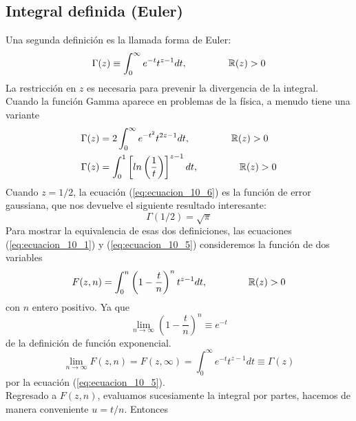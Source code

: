 \subsection{Integral definida (Euler)}
Una segunda definición es la llamada forma de Euler:
\begin{equation}
\Gamma (z) \equiv \int_{0}^{\infty} e^{-t} t^{z-1} dt, \hspace{1.5cm} \mathbb{R}(z) > 0
\label{eq:ecuacion_10_5}
\end{equation}
La restricción en $z$ es necesaria para prevenir la divergencia de la integral. Cuando la función Gamma aparece en problemas de la física, a menudo tiene una variante
\begin{eqnarray}
\Gamma (z) &= 2 \int_{0}^{\infty} e^{-t^{2}} t^{2z-1} dt, \hspace{1.5cm} \mathbb{R}(z) > 0  \label{eq:ecuacion_10_6} \\
\Gamma (z) &=  \int_{0}^{1} \left[ ln\left(\dfrac{1}{t} \right) \right]^{z-1} dt, \hspace{1.5cm} \mathbb{R}(z) > 0 \label{eq:ecuacion_10_7}
\end{eqnarray}
Cuando $z=1/2$, la ecuación (\ref{eq:ecuacion_10_6}) es la función de error gaussiana, que nos devuelve el siguiente resultado interesante:
\begin{equation}
\Gamma (1/2) = \sqrt{\pi}
\label{eq:ecuacion_10_8}
\end{equation}
Para mostrar la equivalencia de esas dos definiciones, las ecuaciones (\ref{eq:ecuacion_10_1}) y (\ref{eq:ecuacion_10_5}) consideremos la función de dos variables
\begin{equation}
F(z,n) = \int_{0}^{n} \left( 1 - \dfrac{t}{n} \right)^{n} t^{z-1} dt, \hspace{1.5cm} \mathbb{R}(z) > 0
\label{eq:ecuacion_10_9}
\end{equation}
con $n$ entero positivo. Ya que
\begin{equation}
\lim_{n \to \infty} \left( 1 - \dfrac{t}{n} \right)^{n} \equiv e^{-t}
\label{eq:ecuacion_10_10}
\end{equation}
de la definición de función exponencial.
\begin{equation}
\lim_{n \to \infty} F(z,n) = F(z,\infty) = \int_{0}^{\infty} e^{-t} t^{z-1} dt \equiv \Gamma (z)
\label{eq:ecuacione_10_11}
\end{equation}
por la ecuación (\ref{eq:ecuacion_10_5}).
\\
Regresado a $F(z,n)$, evaluamos sucesiamente la integral por partes, hacemos de manera conveniente $u = t/n$. Entonces
